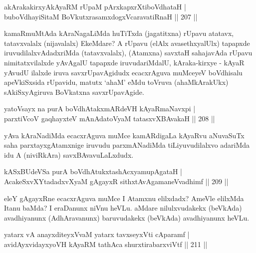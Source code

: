 \begin{shl}
akArakakirxyAkAyaRM rUpaM pArxkapxrXtiboVdhataH |\\
buboVdhayiSitaM BoVkutxrasamxdogxVcaravatiRnaH \hfill || 207 ||
\end{shl}

\begin{artha}
kamaRmuMtAda kAraNagaLiMda huTiTxda (jagatitxna) rUpavu atatavx,  tatavxvalalx (nijavalalx) EkeMdare? A rUpavu (elAlx avasethxyalUlx)  tapapxde iruvudilalxvAdadxriMda (tatavxvalalx), (Atamxna) savxtaH sahajavAda rUpavu nimitatxvilalxde yAvAgalU tapapxde iruvudariMdalU, kAraka-kirxye - kAyaR yAvudU ilalxde iruva savxrUpavAgidudx ecacxrAguva muMceyeV boVdhisalu apeVkiSxsida rUpavidu, matutx `ahaM' eMdu toVruva (ahaMkArakUkx) sAkiSxyAgiruva BoVkatxna savxrUpavAgide.
\end{artha}

\begin{shl}
yatoV\s sayx na purA boVdhAtakxmARdeVH kAyaRmaNavxpi |\\
parxtiVcoV gaqhayxteV mAnAdatoV\s yaM tatasxvXBAvakaH \hfill || 208 ||
\end{shl}

\begin{artha}
yAva kAraNadiMda ecacxrAguva muMce kamARdigaLa kAyaRvu aNuvaSuTx saha parxtayxgAtamxnige iruvudu parxmANadiMda tiLiyuvudilalxvo adariMda idu A (niviRkAra) savxBAvavuLaLxdudx.
\end{artha}


\begin{shl}
kASxBUdeVSa purA boVdhAtukxtashAcxyamupAgataH |\\
AcakeSxvXYtadadxvXyaM gAgayxR sithxtAvAgamaneV\s vadhimf \hfill || 209 ||
\end{shl}

\begin{artha}
eleY gAgayxRne ecacxrAguva muMce I Atamxnu elilxdadx? AmeVle elilxMda Itanu baMda? I eraDanunx niVnu heVLu. aMdare nilulxvudakekx (beVkAda) avadhiyanunx (AdhAravanunx) baruvudakekx (beVkAda) avadhiyanunx heVLu.
\end{artha}


\begin{shl}
yatarx vA anayxditeyxVvaM yatarx tavxseyxVti cAparamf |\\
avidAyxvidayxyoVH kAyaRM tathAca shurxtirabarxviVtf \hfill || 211 ||
\end{shl}

